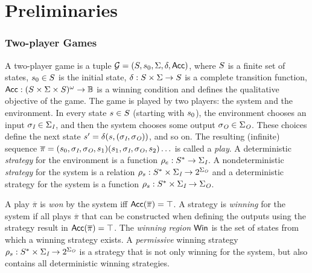 \section{Preliminaries}
\label{sec_prel}



\subsubsection{Two-player Games}
%
A two-player game is a tuple $\mathcal{G} = (S,
s_0, \Sigma, \delta, \mathsf{Acc})$,
where $S$ is a finite set of states, $s_0 \in S$ is the initial state,
$\delta: S \times \Sigma \rightarrow S$
is a complete transition function, $\mathsf{Acc}: (S \times \Sigma \times S)^\omega \rightarrow \mathbb{B}$ is a winning condition
and defines the qualitative objective of the game.
%
The game is played  by two players:  the system and the environment. In every state $s\in S$
(starting with $s_0$), the environment chooses an input
$\sigma_{\textit{I}} \in \Sigma_{\textit{I}}$, and then the system chooses some output $\sigma_{\textit{O}} \in \Sigma_{\textit{O}}$. These choices define the next state $s' = \delta(s,(\sigma_{\textit{I}}, \sigma_{\textit{O}}))$, and so on. The resulting (infinite)
sequence $\overline{\pi} = (s_0,\sigma_{\textit{I}}, \sigma_{\textit{O}}, s_1) (s_1,\sigma_{\textit{I}}, \sigma_{\textit{O}}, s_2) \ldots$ is called a \emph{play}.
A deterministic  \emph{strategy} for the environment is a function
$\rho_e: S^* \rightarrow \Sigma_{\textit{I}}$.
A nondeterministic \emph{strategy} for the system is a relation $\rho_s:
S^* \times \Sigma_{\textit{I}} \rightarrow 2^{\Sigma_{\textit{O}}}$ and a
deterministic  strategy for the system is a function $\rho_s:
S^* \times \Sigma_{\textit{I}} \rightarrow \Sigma_{\textit{O}}$.

A play $\overline{\pi}$ is \emph{won} by the system iff $\mathsf{Acc}(\overline{\pi})=\top$.
 A strategy is \emph{winning} for the system if all plays $\overline{\pi}$ that can be
constructed when defining the outputs using the strategy result in
$\mathsf{Acc}(\overline{\pi})=\top$. The \emph{winning region} $\mathsf{Win}$ is the set of states
from which a winning strategy exists.
A \emph{permissive} winning strategy  $\rho_s:
S^* \times \Sigma_{\textit{I}} \rightarrow 2^{\Sigma_{\textit{O}}}$ is a strategy that is not only winning for the system, but also contains all deterministic winning strategies.

